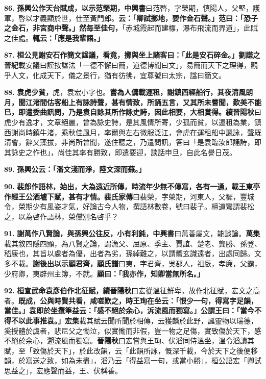 \textbf{86.} \textbf{孫興公作天台賦成，以示范榮期，}{\footnotesize \textbf{中興書}曰范啓，字榮期，慎陽人，父堅，護軍，啓以才義顯於世，仕至黃門郎。}\textbf{云：「卿試擲地，要作金石聲。」范曰：「恐子之金石，非宮商中聲。」然毎至佳句，}{\footnotesize 「赤城霞起而建標，瀑布飛流而界道」，此賦之佳處。}\textbf{輒云：「應是我輩語。」}

\textbf{87.} \textbf{桓公見謝安石作簡文諡議，看竟，擲與坐上諸客曰：「此是安石碎金。」}{\footnotesize \textbf{劉謙之晉紀}載安議曰謹按諡法「一德不懈曰簡，道德博聞曰文」，易簡而天下之理得，觀乎人文，化成天下，儀之景行，猶有彷彿，宜尊號曰太宗，諡曰簡文。}

\textbf{88.} \textbf{袁虎少貧，}{\footnotesize 虎，袁宏小字也。}\textbf{嘗為人傭載運租，謝鎮西經船行，其夜清風朗月，聞江渚間估客船上有詠詩聲，甚有情致，所誦五言，又其所未嘗聞，歎美不能已，即遣委曲訊問，乃是袁自詠其所作詠史詩，因此相要，大相賞得。}{\footnotesize \textbf{續晉陽秋}曰虎少有逸才，文章絕麗，曾為詠史詩，是其風情所寄，少孤而貧，以運租為業，鎮西謝尚時鎮牛渚，乘秋佳風月，率爾與左右微服泛江，會虎在運租船中諷詠，聲既清會，辭又藻拔，非尚所曾聞，遂住聽之，乃遣問訊，答曰「是袁臨汝郎誦詩，即其詠史之作也」，尚佳其率有勝致，即遣要迎，談話申旦，自此名譽日茂。}

\textbf{89.} \textbf{孫興公云：「潘文淺而淨，陸文深而蕪。」}

\textbf{90.} \textbf{裴郎作語林，始出，大為遠近所傳，時流年少無不傳寫，各有一通，載王東亭作經王公酒壚下賦，甚有才情。}{\footnotesize \textbf{裴氏家傳}曰裴榮，字榮期，河東人，父穉，豐城令，榮期少有風姿才氣，好論古今人物，撰語林數卷，號曰裴子。檀道鸞謂裴松之，以為啓作語林，榮儻別名啓乎？}

\textbf{91.} \textbf{謝萬作八賢論，與孫興公往反，小有利鈍，}{\footnotesize \textbf{中興書}曰萬善屬文，能談論。\textbf{萬集}載其敘四隱四顯，為八賢之論，謂漁父、屈原、季主、賈誼、楚老、龔勝、孫登、嵇康也，其旨以處者為優，出者為劣，孫綽難之，以謂體玄識遠者，出處同歸。文多不載。}\textbf{謝後出以示顧君齊，}{\footnotesize \textbf{顧氏譜}曰夷，字君齊，吳郡人，祖廞，孝廉，父霸，少府卿，夷辟州主簿，不就。}\textbf{顧曰：「我亦作，知卿當無所名。」}

\textbf{92.} \textbf{桓宣武命袁彥伯作北征賦，}{\footnotesize \textbf{續晉陽秋}曰宏從溫征鮮卑，故作北征賦，宏文之高者。}\textbf{既成，公與時賢共看，咸嗟歎之，時王珣在坐云：「恨少一句，得寫字足韻，當佳。」袁即於坐攬筆益云：「感不絕於余心，泝流風而獨寫。」公謂王曰：「當今不得不以此事推袁。」}{\footnotesize \textbf{宏集}載其賦云聞所聞於相傳，云獲麟於此野，誕靈物以瑞德，奚授體於虞者，悲尼父之慟泣，似實慟而非假，豈一物之足傷，實致傷於天下，感不絕於余心，遡流風而獨寫。\textbf{晉陽秋}曰宏嘗與王珣、伏滔同侍溫坐，溫令滔讀其賦，至「致傷於天下」，於此改韻，云「此韻所詠，慨深千載，今於天下之後便移韻，於寫送之致，如為未盡」，滔乃云「得益寫一句，或當小勝」，桓公語宏「卿試思益之」，宏應聲而益，王、伏稱善。}

